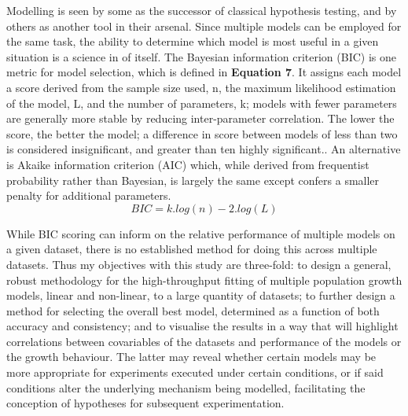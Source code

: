 \documentclass[11pt]{article}
\begin{document}
Modelling is seen by some as the successor of classical hypothesis testing, and by others as another tool in their arsenal.\parencite{Johnson2004} Since multiple models can be employed for the same task, the ability to determine which model is most useful in a given situation is a science in of itself. The Bayesian information criterion (BIC) is one metric for model selection, which is defined in \textbf{Equation 7}. It assigns each model a score derived from the sample size used, n, the maximum likelihood estimation of the model, L, and the number of parameters, k; models with fewer parameters are generally more stable by reducing inter-parameter correlation.\parencite{Akaike1974,Zwietering1990} The lower the score, the better the model; a difference in score between models of less than two is considered insignificant, and greater than ten highly significant.\parencite{Vrieze2012,Posada2004}. An alternative is Akaike information criterion (AIC) which, while derived from frequentist probability rather than Bayesian, is largely the same except confers a smaller penalty for additional parameters.\parencite{Posada2004} 
\begin{equation}
    BIC = k.log(n) - 2.log(L)
\end{equation}
\vspace{2mm}

\noindent While BIC scoring can inform on the relative performance of multiple models on a given dataset, there is no established method for doing this across multiple datasets. Thus my objectives with this study are three-fold: to design a general, robust methodology for the high-throughput fitting of multiple population growth models, linear and non-linear, to a large quantity of datasets; to further design a method for selecting the overall best model, determined as a function of both accuracy and consistency; and to visualise the results in a way that will highlight correlations between covariables of the datasets and performance of the models or the growth behaviour. The latter may reveal whether certain models may be more appropriate for experiments executed under certain conditions, or if said conditions alter the underlying mechanism being modelled, facilitating the conception of hypotheses for subsequent experimentation.
\end{document}
